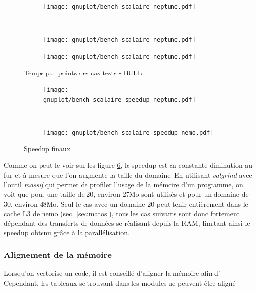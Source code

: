 \begin{figure}[!ht]
  \centering
  \begin{subfigure}[b]{0.5\textwidth}
    \centering
    \texttt{[image: gnuplot/bench\_scalaire\_neptune.pdf]}
  \caption{\label{fig:bench_scal_neptune_nonper}}
  \end{subfigure}%
  ~
  \begin{subfigure}[b]{0.5\textwidth}
    \centering
    \texttt{[image: gnuplot/bench\_scalaire\_neptune.pdf]}
  \caption{\label{fig:bench_scal_neptune_sym}}
  \end{subfigure}
  \begin{subfigure}[b]{0.5\textwidth}
    \centering
    \texttt{[image: gnuplot/bench\_scalaire\_neptune.pdf]}
  \caption{\label{fig:bench_scal_neptune_per}}
  \end{subfigure}
  \caption{\label{fig:bench_scal_neptune}Temps par points des cas tests - BULL}
\end{figure}


\begin{figure}[!ht]
  \centering
  \begin{subfigure}[b]{0.5\textwidth}
    \centering
    \texttt{[image: gnuplot/bench\_scalaire\_speedup\_neptune.pdf]}
  \caption{\label{fig:bench_scal_neptune_speedup}}
  \end{subfigure}%
  ~
  \begin{subfigure}[b]{0.5\textwidth}
    \centering
    \texttt{[image: gnuplot/bench\_scalaire\_speedup\_nemo.pdf]}
  \caption{\label{fig:bench_scal_nemo_speedup}}
  \end{subfigure}
  \caption{\label{fig:bench_scal_speedups}Speedup finaux}
\end{figure}

Comme on peut le voir sur les figure \ref{fig:bench_scal_nemo_speedup}, le speedup est en constante diminution au fur et à mesure que l'on augmente la taille du domaine. En utilisant \textit{valgrind} avec l'outil \textit{massif} qui permet de profiler l'usage de la mémoire d'un programme, on voit que pour une taille de 20, environ 27Mo sont utilisés et pour un domaine de 30, environ 48Mo. Seul le cas avec un domaine 20 peut tenir entièrement dans le cache L3 de nemo (sec. \ref{sec:matos}), tous les cas suivants sont donc fortement dépendant des transferts de données se réalisant depuis la RAM, limitant ainsi le speedup obtenu grâce à la parallélisation.

\subsubsection{Alignement de la mémoire}
Lorsqu'on vectorise un code, il est conseillé d'aligner la mémoire afin d'
Cependant, les tableaux se trouvant dans les modules ne peuvent être aligné



